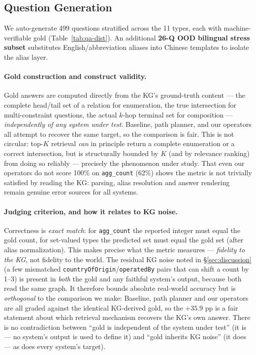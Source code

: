 \documentclass[11pt,a4paper]{article}
\newcommand{\qtype}[1]{\texttt{\small #1}}
\begin{document}
\subsection{Question Generation}
We auto-generate 499 questions stratified across the 11 types, each with machine-verifiable gold (Table~\ref{tab:qa-dist}). An additional \textbf{26-Q OOD bilingual stress subset} substitutes English/abbreviation aliases into Chinese templates to isolate the alias layer.

\paragraph{Gold construction and construct validity.}
Gold answers are computed directly from the KG's ground-truth content --- the complete head/tail set of a relation for enumeration, the true intersection for multi-constraint questions, the actual $k$-hop terminal set for composition --- \emph{independently of any system under test}. Baseline, path planner, and our operators all attempt to recover the same target, so the comparison is fair. This is not circular: top-$K$ retrieval \emph{can} in principle return a complete enumeration or a correct intersection, but is structurally bounded by $K$ (and by relevance ranking) from doing so reliably --- precisely the phenomenon under study. That even our operators do not score 100\% on \qtype{agg\_count} (62\%) shows the metric is not trivially satisfied by reading the KG: parsing, alias resolution and answer rendering remain genuine error sources for all systems.

\paragraph{Judging criterion, and how it relates to KG noise.}
Correctness is \emph{exact match}: for \qtype{agg\_count} the reported integer must equal the gold count, for set-valued types the predicted set must equal the gold set (after alias normalization). This makes precise what the metric measures --- \emph{fidelity to the KG}, not fidelity to the world. The residual KG noise noted in §\ref{sec:discussion} (a few mismatched \texttt{countryOfOrigin}/\texttt{operatedBy} pairs that can shift a count by 1--3) is present in \emph{both} the gold and any faithful system's output, because both read the same graph. It therefore bounds absolute real-world accuracy but is \emph{orthogonal} to the comparison we make: Baseline, path planner and our operators are all graded against the identical KG-derived gold, so the $+35.9$ pp is a fair statement about which retrieval mechanism recovers the KG's own answer. There is no contradiction between ``gold is independent of the system under test'' (it is --- no system's output is used to define it) and ``gold inherits KG noise'' (it does --- as does every system's target).
\end{document}
